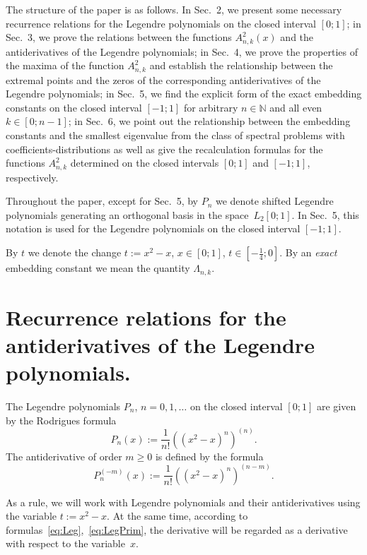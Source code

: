 \documentclass[12pt,oneside]{amsproc}
\numberwithin{equation}{section}
\begin{document}
 The structure of the paper is as follows.
 In Sec.~2,
we present some necessary recurrence relations
for the Legendre polynomials
on the closed interval
$[0;1]$;
in Sec.~3,
we prove the relations between the functions
$A^2_{n,k}(x)$
and the antiderivatives of the Legendre polynomials;
in Sec.~4,
we prove the properties of the maxima of the function
$A^2_{n,k}$
and establish the relationship between the extremal points
and the zeros of the corresponding antiderivatives of the Legendre polynomials;
in Sec.~5,
we find the explicit form of the exact embedding constants
on the closed interval
$[-1;1]$
for
arbitrary
$n\in\mathbb{N}$
and all even
$k\in[0;n-1]$;
in Sec.~6,
we point out the relationship between the embedding constants
and the smallest eigenvalue from the class of spectral problems
with coefficients-distributions
as well as give the recalculation formulas
for the functions
$A^2_{n,k}$
determined
on the closed intervals
$[0;1]$
and
$[-1;1]$,
respectively.

 Throughout the paper, except for Sec.~5,
by
$P_n$
we denote shifted Legendre polynomials
generating an orthogonal basis
in the space~$L_2[0;1]$.
 In Sec.~5, this notation
is used for the Legendre polynomials on the closed interval $[-1;1]$.

 By
$t$
we denote the change
$t:=x^2-x$, $x\in[0;1]$, $t\in\left[-\frac14;0\right]$.
 By an \textit{exact} embedding constant
we mean the quantity
$\Lambda_{n,k}$.

\section{Recurrence relations for the antiderivatives of the Legendre polynomials.}

 The Legendre polynomials
$P_n$, $n=0,1,\ldots$
on the closed interval
$[0;1]$
are given by the Rodrigues formula
\begin{equation}
\label{eq:Leg}
P_n(x):=\frac{1}{n!}\left((x^2-x)^n\right)^{(n)}.
\end{equation}
  The antiderivative of order $m\geqslant 0$
is defined by the formula
\begin{equation}
\label{eq:LegPrim}
P_n^{(-m)}(x):=\frac{1}{n!}\left((x^2-x)^n\right)^{(n-m)}.
\end{equation}

 As a rule,
we will work with Legendre polynomials
and their antiderivatives
using the variable
$t:=x^2-x$.
 At the same time,
according to formulas~\eqref{eq:Leg},~\eqref{eq:LegPrim},
the derivative will be regarded
as a derivative with respect to the variable~$x$.
\end{document}
